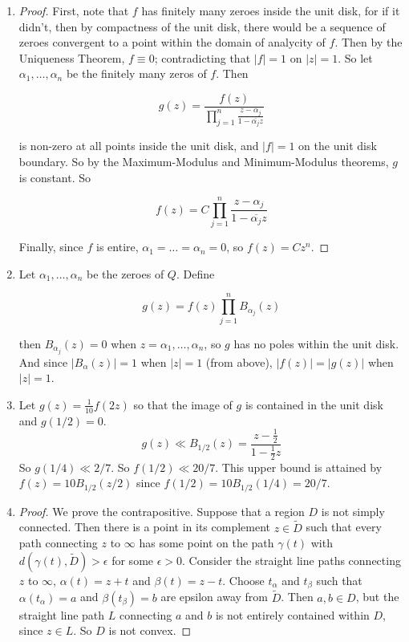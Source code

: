 \documentclass[11pt, letterpaper]{article}
\begin{document}
\begin{enumerate}
  \item \begin{proof}
    First, note that $f$ has finitely many zeroes inside the unit disk, for if it didn't, then by compactness of the unit disk, there would be a sequence of zeroes convergent to a point within the domain of analycity of $f$. Then by the Uniqueness Theorem, $f \equiv 0$; contradicting that $\vert f \vert = 1$ on $\vert z \vert = 1$. So let $\alpha_1, \dots, \alpha_n$ be the finitely many zeros of $f$. Then 

    $$
    g(z) = \frac{f(z)}{\prod_{j = 1}^n \frac{z - \alpha_j}{1 - \overline{\alpha_j}z}}
    $$

    is non-zero at all points inside the unit disk, and $\vert f \vert = 1$ on the unit disk boundary. So by the Maximum-Modulus and Minimum-Modulus theorems, $g$ is constant. So

    $$
    f(z) = C \prod_{j = 1}^n \frac{z - \alpha_j}{1 - \overline{\alpha_j}z}
    $$

    Finally, since $f$ is entire, $\alpha_1 = \dots = \alpha_n = 0$, so $f(z) = Cz^n$.
  \end{proof}

  \item Let $\alpha_1, \dots, \alpha_n$ be the zeroes of $Q$. Define
  
  $$
  g(z) = f(z)\prod_{j = 1}^n B_{\alpha_j}(z)
  $$

  then $B_{\alpha_j}(z) = 0$ when $z = \alpha_1, \dots, \alpha_n$, so $g$ has no poles within the unit disk. And since $\vert B_\alpha(z) \vert = 1$ when $\vert z \vert = 1$ (from above), $\vert f(z) \vert = \vert g(z) \vert$ when $\vert z \vert = 1$.

  \item Let $g(z) = \frac{1}{10} f(2z)$ so that the image of $g$ is contained in the unit disk and $g(1/2) = 0$.
  $$
  g(z) \ll B_{1/2}(z) = \frac{z - \frac{1}{2}}{1 - \frac{1}{2}z}
  $$
  So $g(1/4) \ll 2/7$. So $f(1/2) \ll 20/7$. This upper bound is attained by $f(z) = 10B_{1/2}(z/2)$ since $f(1/2) = 10B_{1/2}(1/4) = 20/7$.

  \item \begin{proof}
    We prove the contrapositive. Suppose that a region $D$ is not simply connected. Then there is a point in its complement $z \in \tilde D$ such that every path connecting $z$ to $\infty$ has some point on the path $\gamma(t)$ with $d(\gamma(t), \tilde D) > \epsilon$ for some $\epsilon > 0$. Consider the straight line paths connecting $z$ to $\infty$, $\alpha(t) = z + t$ and $\beta(t) = z - t$. Choose $t_\alpha$ and $t_\beta$ such that $\alpha(t_\alpha) = a$ and $\beta(t_\beta) = b$ are epsilon away from $\tilde D$. Then $a, b \in D$, but the straight line path $L$ connecting $a$ and $b$ is not entirely contained within $D$, since $z \in L$. So $D$ is not convex.
  \end{proof}
\end{enumerate}
\end{document}
